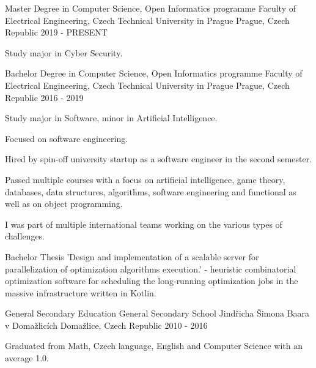 
\begin{cventries}
	\cventry
	{Master Degree in Computer Science, Open Informatics programme}
	{Faculty of Electrical Engineering, Czech Technical University in Prague}
	{Prague, Czech Republic}
	{2019 - PRESENT}
	{
		\begin{cvitems}
			\item {Study major in Cyber Security.}
		\end{cvitems}
	}

	\cventry
	{Bachelor Degree in Computer Science, Open Informatics programme}
	{Faculty of Electrical Engineering, Czech Technical University in Prague}
	{Prague, Czech Republic}
	{2016 - 2019}
	{
		\begin{cvitems}
			\item {Study major in Software, minor in Artificial Intelligence.}
			\item {Focused on software engineering.}
			\item {Hired by spin-off university startup as a software engineer in the second semester.}
			\item {Passed multiple courses with a focus on artificial intelligence, game theory, databases,
			data structures, algorithms, software engineering and functional as well as on object programming.}
			 \item {I was part of multiple international teams working on the various types of challenges.}
			 \item {Bachelor Thesis 'Design and implementation of a scalable server for parallelization of optimization algorithms execution.'
             - heuristic combinatorial optimization software for scheduling the long-running optimization jobs in the massive infrastructure written in Kotlin.}
		\end{cvitems}
	}
		
		
	\cventry
	{General Secondary Education}
	{General Secondary School Jindřicha Šimona Baara v Domažlicích}
	{Domažlice, Czech Republic}
	{2010 - 2016}
	{
		\begin{cvitems}
			\item {Graduated from Math, Czech language, English and Computer Science with an average 1.0.}
		\end{cvitems}
	}

\end{cventries}